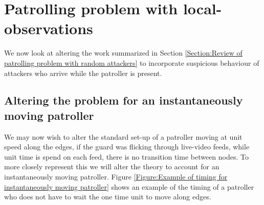 \documentclass[a4paper,10pt]{article}
\theoremstyle{definition}
\theoremstyle{definition}
\theoremstyle{remark}
\theoremstyle{definition}
\begin{document}
%
%
%
%
%
%
%

\section{Patrolling problem with local-observations}
\label{Section:Patrolling games with random attackers and local-observations}
We now look at altering the work summarized in Section \ref{Section:Review of patrolling problem with random attackers} to incorporate suspicious behaviour of attackers who arrive while the patroller is present.

\subsection{Altering the problem for an instantaneously moving patroller}
We may now wish to alter the standard set-up of a patroller moving at unit speed along the edges, if the guard was flicking through live-video feeds, while unit time is spend on each feed, there is no transition time between nodes. To more closely represent this we will alter the theory to account for an instantaneously moving patroller. Figure \ref{Figure:Example of timing for instantaneously moving patroller} shows an example of the timing of a patroller who does not have to wait the one time unit to move along edges.
\end{document}
